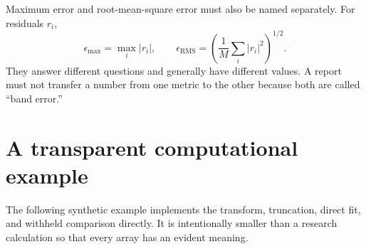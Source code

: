Maximum error and root-mean-square error must also be named separately. For
residuals $r_i$,
\begin{equation}
  \epsilon_{\max}=\max_i|r_i|,
  \qquad
  \epsilon_{\mathrm{RMS}}
  =\left(\frac1M\sum_i|r_i|^2\right)^{1/2}.
  \label{eq:training-isolated-max-rms}
\end{equation}
They answer different questions and generally have different values. A report
must not transfer a number from one metric to the other because both are called
``band error.''

\section{A transparent computational example}

The following synthetic example implements the transform, truncation, direct
fit, and withheld comparison directly. It is intentionally smaller than a
research calculation so that every array has an evident meaning.


